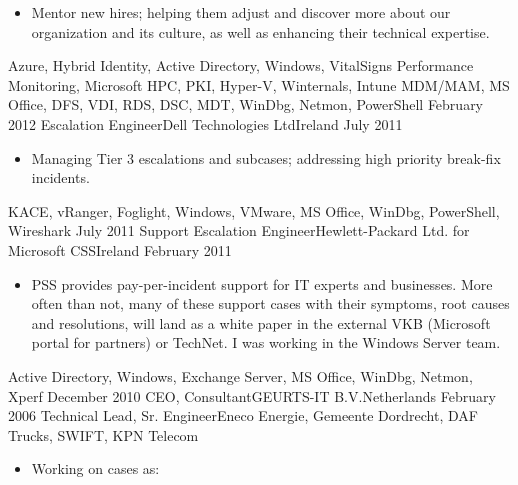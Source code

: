 \begin{experiences}
{\begin{itemize}
                        \item Mentor new hires; helping them adjust and discover more about our organization and its culture, as well as enhancing their technical expertise.
                      \end{itemize}
                    }
                    {Azure, Hybrid Identity, Active Directory, Windows, VitalSigns Performance Monitoring, Microsoft HPC, PKI, Hyper-V, Winternals, Intune MDM/MAM, MS Office, DFS, VDI, RDS, DSC, MDT, WinDbg, Netmon, PowerShell}
  \emptySeparator
  \experience
  {February 2012}   {Escalation Engineer}{Dell Technologies Ltd}{Ireland}
  {July 2011}       {
                      \begin{itemize}
                        \item Managing Tier 3 escalations and subcases; addressing high priority break-fix incidents.                                
                      \end{itemize}
                    }
                    {KACE, vRanger, Foglight, Windows, VMware, MS Office, WinDbg, PowerShell, Wireshark}
  \emptySeparator
  \experience
  {July 2011}       {Support Escalation Engineer}{Hewlett-Packard Ltd. for Microsoft CSS}{Ireland}
  {February 2011}   {                    
                      \begin{itemize}
                        \item PSS provides pay-per-incident support for IT experts and businesses. More often than not, many of these support cases with their symptoms, root causes and resolutions, will land as a white paper in the external VKB (Microsoft portal for partners) or TechNet. I was working in the Windows Server team.                                       
                      \end{itemize}
                    }
                    {Active Directory, Windows, Exchange Server, MS Office, WinDbg, Netmon, Xperf}
  \emptySeparator   
  \consultantexperience
  {December 2010}   {CEO, Consultant}{GEURTS-IT B.V.}{Netherlands}
  {February 2006}   {Technical Lead, Sr. Engineer}{Eneco Energie, Gemeente Dordrecht, DAF Trucks, SWIFT, KPN Telecom}
                    {
                      \begin{itemize}
                        \item Working on cases as:
                        

\end{itemize}}
\end{experiences}
